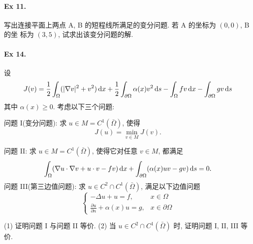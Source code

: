 \paragraph{Ex 11.}
写出连接平面上两点 A, B 的短程线所满足的变分问题. 若 A 的坐标为 $(0, 0)$, B 的坐
标为 $(3, 5)$, 试求出该变分问题的解.

\paragraph{Ex 14.}
设
\[
J(v) = \frac{1}{2} \int_{\Omega} (|\nabla v|^2 + v^2)\operatorname{d\!} x
+ \frac{1}{2} \int_{\partial \Omega} \alpha(x) v^2 \operatorname{d\!} s
- \int_{\Omega} fv \operatorname{d\!} x - \int_{\partial \Omega} gv \operatorname{d\!} s
\]
其中 $\alpha(x) \geq 0$. 考虑以下三个问题:

问题 I(变分问题): 求 $u \in M = C^1(\bar \Omega)$, 使得
\[
J(u)= \min_{v \in M} J(v).
\]

问题 II: 求 $u \in M = C^1(\bar \Omega)$, 使得它对任意 $v \in M$, 都满足
\[
\int_{\Omega} (\nabla u \cdot \nabla v + u \cdot v - fv)\operatorname{d\!} x
+ \int_{\partial \Omega} (\alpha(x) uv-gv )\operatorname{d\!} s = 0.
\]
问题 III(第三边值问题): 求 $u \in C^2 \cap C^1(\bar \Omega)$, 满足以下边值问题
\[
\begin{cases}
- \Delta u + u = f, & x \in \Omega \\
\frac{\partial u}{\partial n} + \alpha (x) u = g, & x \in \partial \Omega
\end{cases}
\]

(1) 证明问题 I 与问题 II 等价.
(2) 当 $u \in C^2 \cap C^1(\bar \Omega)$ 时, 证明问题 I, II, III 等价.

\endinput